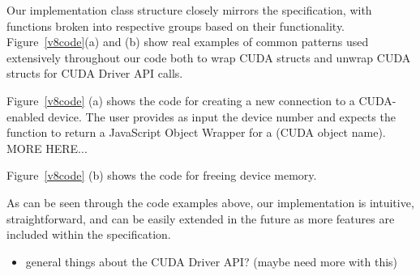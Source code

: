 Our implementation class structure closely mirrors the specification, with
functions broken into respective groups based on their functionality.
Figure~\ref{v8code}(a) and (b) show real examples of common patterns used
extensively throughout our code both to wrap CUDA structs and unwrap CUDA
structs for CUDA Driver API calls.  

Figure~\ref{v8code} (a) shows the code for creating a new connection to a
CUDA-enabled device. The user provides as input the device number and expects
the function to return a JavaScript Object Wrapper for a (CUDA object name).
MORE HERE...

Figure~\ref{v8code} (b) shows the code for freeing device memory.

As can be seen through the code examples above, our implementation is intuitive,
straightforward, and can be easily extended in the future as more features are
included within the \name specification.


\begin{itemize}

	\item general things about the CUDA Driver API? (maybe need more with this)

\end{itemize}




